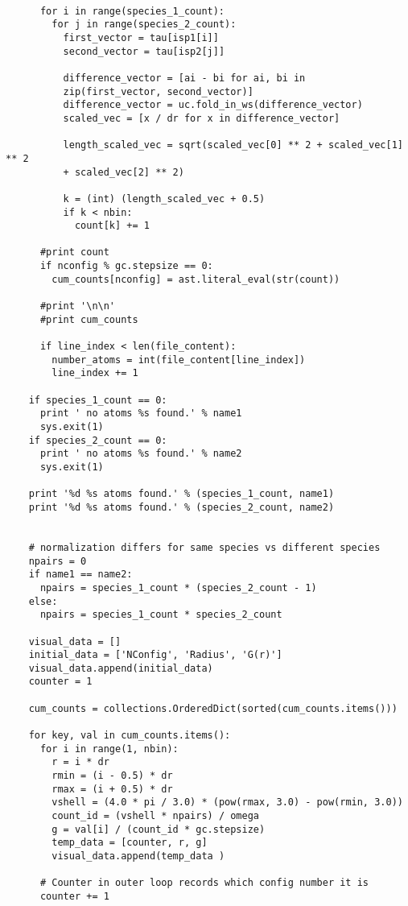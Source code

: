 \begin{verbatim}
          
      for i in range(species_1_count):
        for j in range(species_2_count):
          first_vector = tau[isp1[i]]
          second_vector = tau[isp2[j]]
          
          difference_vector = [ai - bi for ai, bi in 
          zip(first_vector, second_vector)]
          difference_vector = uc.fold_in_ws(difference_vector)
          scaled_vec = [x / dr for x in difference_vector]
          
          length_scaled_vec = sqrt(scaled_vec[0] ** 2 + scaled_vec[1] ** 2 
          + scaled_vec[2] ** 2)
         
          k = (int) (length_scaled_vec + 0.5)
          if k < nbin:
            count[k] += 1
      
      #print count
      if nconfig % gc.stepsize == 0:
        cum_counts[nconfig] = ast.literal_eval(str(count))

      #print '\n\n'
      #print cum_counts
       
      if line_index < len(file_content):
        number_atoms = int(file_content[line_index])
        line_index += 1
    
    if species_1_count == 0:
      print ' no atoms %s found.' % name1
      sys.exit(1)
    if species_2_count == 0:
      print ' no atoms %s found.' % name2
      sys.exit(1)
  
    print '%d %s atoms found.' % (species_1_count, name1)
    print '%d %s atoms found.' % (species_2_count, name2)
  
        
    # normalization differs for same species vs different species
    npairs = 0
    if name1 == name2:
      npairs = species_1_count * (species_2_count - 1)
    else:
      npairs = species_1_count * species_2_count
    
    visual_data = []
    initial_data = ['NConfig', 'Radius', 'G(r)']
    visual_data.append(initial_data)
    counter = 1

    cum_counts = collections.OrderedDict(sorted(cum_counts.items()))

    for key, val in cum_counts.items():
      for i in range(1, nbin):
        r = i * dr
        rmin = (i - 0.5) * dr
        rmax = (i + 0.5) * dr
        vshell = (4.0 * pi / 3.0) * (pow(rmax, 3.0) - pow(rmin, 3.0))
        count_id = (vshell * npairs) / omega
        g = val[i] / (count_id * gc.stepsize)
        temp_data = [counter, r, g]
        visual_data.append(temp_data )
      
      # Counter in outer loop records which config number it is
      counter += 1
           

\end{verbatim}
